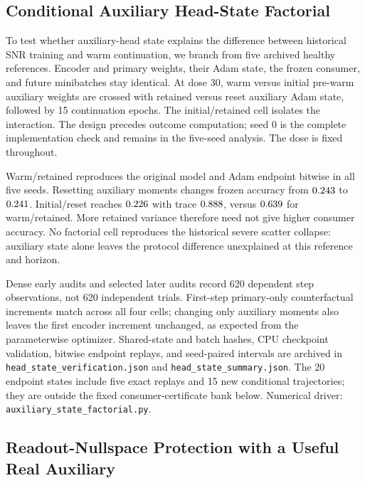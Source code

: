 \documentclass{article}
\begin{document}
\subsection{Conditional Auxiliary Head-State Factorial}\label{app:head_state}

To test whether auxiliary-head state explains the difference between historical SNR training and warm continuation, we branch from five archived healthy references. Encoder and primary weights, their Adam state, the frozen consumer, and future minibatches stay identical. At dose $30$, warm versus initial pre-warm auxiliary weights are crossed with retained versus reset auxiliary Adam state, followed by 15 continuation epochs. The initial/retained cell isolates the interaction. The design precedes outcome computation; seed 0 is the complete implementation check and remains in the five-seed analysis. The dose is fixed throughout.



Warm/retained reproduces the original model and Adam endpoint bitwise in all five seeds. Resetting auxiliary moments changes frozen accuracy from $0.243$ to $0.241$. Initial/reset reaches $0.226$ with trace $0.888$, versus $0.639$ for warm/retained. More retained variance therefore need not give higher consumer accuracy. No factorial cell reproduces the historical severe scatter collapse: auxiliary state alone leaves the protocol difference unexplained at this reference and horizon.

Dense early audits and selected later audits record 620 dependent step observations, not 620 independent trials. First-step primary-only counterfactual increments match across all four cells; changing only auxiliary moments also leaves the first encoder increment unchanged, as expected from the parameterwise optimizer. Shared-state and batch hashes, CPU checkpoint validation, bitwise endpoint replays, and seed-paired intervals are archived in \texttt{head\_state\_verification.json} and \texttt{head\_state\_summary.json}. The 20 endpoint states include five exact replays and 15 new conditional trajectories; they are outside the fixed consumer-certificate bank below. Numerical driver: \texttt{auxiliary\_state\_factorial.py}.

\subsection{Readout-Nullspace Protection with a Useful Real Auxiliary}\label{app:benefit_confirmation}
\end{document}
